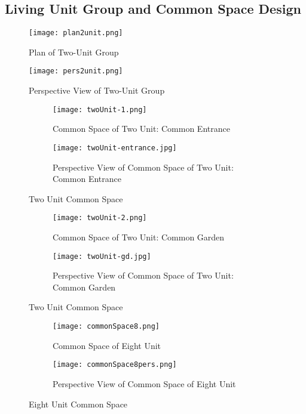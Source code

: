 \subsection{Living Unit Group and Common Space Design}
\begin{figure}[htbp]
	\centering
		\texttt{[image: plan2unit.png]}
	\caption[Plan of Two-Unit Group]{Plan of Two-Unit Group}
	\label{fig:plan2unit}
\end{figure}
\begin{figure}[htbp]
	\centering
		\texttt{[image: pers2unit.png]}
	\caption[Perspective View of Two-Unit Group]{Perspective View of Two-Unit Group}
	\label{fig:pers2unit}
\end{figure}
\begin{figure}
\centering
\begin{subfigure}{\textwidth}
  \centering
  \texttt{[image: twoUnit-1.png]}
  \caption{Common Space of Two Unit: Common Entrance}
  \label{fig:twoUnit-1}
\end{subfigure}
\begin{subfigure}{\textwidth}
  \centering
  \texttt{[image: twoUnit-entrance.jpg]}
  \caption{Perspective View of Common Space of Two Unit: Common Entrance}
  \label{fig:twoUnit-entrance}
\end{subfigure}
\caption{Two Unit Common Space}
\label{fig:twoUnitCommonSpaceEntrance}
\end{figure}

\begin{figure}
\centering
\begin{subfigure}{\textwidth}
  \centering
  \texttt{[image: twoUnit-2.png]}
  \caption{Common Space of Two Unit: Common Garden}
  \label{fig:twoUnit-2}
\end{subfigure}
\begin{subfigure}{\textwidth}
  \centering
  \texttt{[image: twoUnit-gd.jpg]}
  \caption{Perspective View of Common Space of Two Unit: Common Garden}
  \label{fig:twoUnit-garden}
\end{subfigure}
\caption{Two Unit Common Space}
\label{fig:twoUnitCommonSpaceGarden}
\end{figure}

\begin{figure}
\centering
\begin{subfigure}{\textwidth}
  \centering
  \texttt{[image: commonSpace8.png]}
  \caption{Common Space of Eight Unit}
  \label{fig:commonSpace8}
\end{subfigure}
\begin{subfigure}{\textwidth}
  \centering
  \texttt{[image: commonSpace8pers.png]}
  \caption{Perspective View of Common Space of Eight Unit}
  \label{fig:commonSpace8pers}
\end{subfigure}
\caption{Eight Unit Common Space}
\label{fig:eightUnitCommonSpace}
\end{figure}

